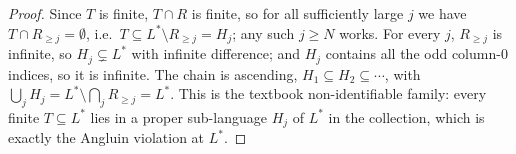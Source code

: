 \documentclass[11pt]{article}
\numberwithin{equation}{section}
\newcommand{\Val}{H}
\theoremstyle{plain}
\theoremstyle{definition}
\theoremstyle{remark}
\begin{document}
\begin{proof}
Since $T$ is finite, $T \cap R$ is finite, so for all sufficiently large $j$ we have $T \cap
R_{\ge j} = \emptyset$, i.e.\ $T \subseteq L^* \setminus R_{\ge j} = \Val_j$; any such $j \ge
N$ works. For every $j$, $R_{\ge j}$ is infinite, so $\Val_j \subsetneq L^*$ with infinite
difference; and $\Val_j$ contains all the odd column-$0$ indices, so it is infinite. The chain
is ascending, $\Val_1 \subseteq \Val_2 \subseteq \cdots$, with $\bigcup_j \Val_j = L^*
\setminus \bigcap_j R_{\ge j} = L^*$. This is the textbook non-identifiable family: every
finite $T \subseteq L^*$ lies in a proper sub-language $\Val_j$ of $L^*$ in the collection,
which is exactly the Angluin violation at $L^*$.
\end{proof}

\begin{statementbox}
\ThmFlood*
\end{statementbox}
\end{document}
